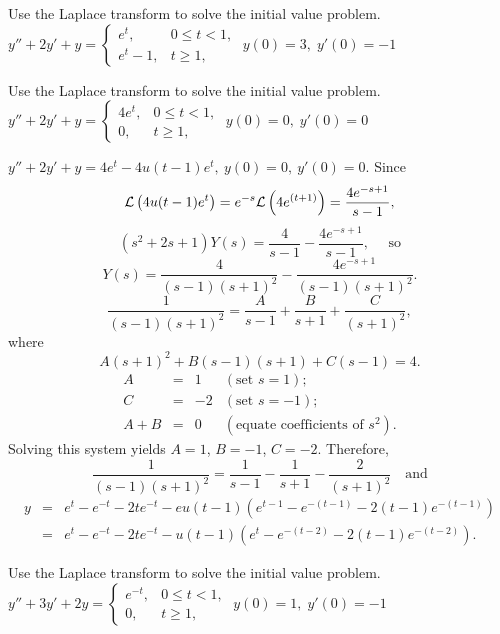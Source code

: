 \documentclass{ximera}
\begin{document}
\begin{problem}\label{exer:8.5.15} Use the Laplace transform to solve the initial value problem.
$y''+2y'+y=\left\{\begin{array}{cl}
e^t,&0\le t<1,\\e^t-1,&t\ge 1,\end{array}\right.\;  y(0)=3,\;
y'(0)=-1$
\end{problem}

\begin{problem}\label{exer:8.5.16}
Use the Laplace transform to solve the initial value problem.
$y''+2y'+y=\left\{\begin{array}{cl}
4e^t,&0\le t<1,\\0,&t\ge 1,\end{array}\right.\;  y(0)=0,\;
y'(0)=0$

\begin{solution}
$y''+2y'+y=4e^t-4u(t-1)e^t,\ y(0)=0,\ y'(0)=0$. Since
$$
{\cal L}\left(4u(t-1)e^t\right)=e^{-s}{\cal
L}\left(4e^{(t+1)}\right)=\frac{4e^{-s+1}}{s-1},
$$
$$
(s^2+2s+1)Y(s)=\frac{4}{s-1}-\frac{4e^{-s+1}}{s-1},\quad\mbox{ so}
$$
$$
Y(s)=\frac{4}{(s-1)(s+1)^2}-\frac{4e^{-s+1}}{(s-1)(s+1)^2}.
$$
$$
\frac{1}{(s-1)(s+1)^2}=\frac{A}{s-1}+\frac{B}{s+1}+
\frac{C}{(s+1)^2},
$$
where
$$
A(s+1)^2+B(s-1)(s+1)+C(s-1)=4.
$$
$$
\begin{array}{rcll}
A&=&1&(\mbox{set }s=1);\\
C&=&-2&(\mbox{set }s=-1);\\
A+B&=&0&(\mbox{equate coefficients of }s^2).
\end{array}
$$
Solving this system yields $A=1$, $B=-1$, $C=-2$. Therefore,
$$
\frac{1}{(s-1)(s+1)^2}=\frac{1}{s-1}-\frac{1}{s+1}-
\frac{2}{(s+1)^2}\quad \mbox{and}
$$
\begin{eqnarray*}
y&=&e^t-e^{-t}-2te^{-t}-eu(t-1)\left(e^{t-1}-e^{-(t-1)}-
2(t-1)e^{-(t-1)}\right)\\
&=&
e^t-e^{-t}-2te^{-t}-u(t-1)\left(e^t-e^{-(t-2)}-2(t-1)e^{-(t-2)}\right).
\end{eqnarray*}
\end{solution}
\end{problem}

\begin{problem}\label{exer:8.5.17} Use the Laplace transform to solve the initial value problem.
$y''+3y'+2y=\left\{\begin{array}{cl}
e^{-t},&0\le t<1,\\0,&t\ge 1,\end{array}\right.\;  y(0)=1,\;  y'(0)=-1$
\end{problem}
\end{document}
